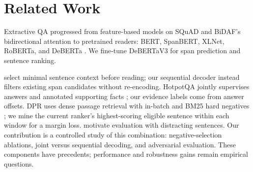 \section{Related Work}
\label{sec:related-work}
Extractive QA progressed from feature-based models on SQuAD
\citep{rajpurkar2016squad} and BiDAF's bidirectional attention
\citep{seo2017bidaf} to pretrained readers: BERT, SpanBERT, XLNet,
RoBERTa, and DeBERTa \citep{devlin2019bert,joshi2020spanbert,
yang2019xlnet,liu2019roberta,he2021deberta}. We fine-tune
DeBERTaV3 \citep{he2023debertav3} for span prediction and sentence ranking.

\citet{min2018minimal} select minimal sentence context before reading;
our sequential decoder instead filters existing span candidates without
re-encoding. HotpotQA jointly supervises answers and annotated supporting
facts \citep{yang2018hotpotqa}; our evidence labels come from answer offsets.
DPR uses dense passage retrieval with in-batch and BM25 hard negatives
\citep{karpukhin2020dpr}; we mine the current ranker's highest-scoring
eligible sentence within each window for a margin loss.
\citet{jia2017adversarial} motivate evaluation with distracting sentences.
Our contribution is a controlled study of this combination: negative-selection
ablations, joint versus sequential decoding, and adversarial evaluation.
These components have precedents; performance and robustness gains remain
empirical questions.
